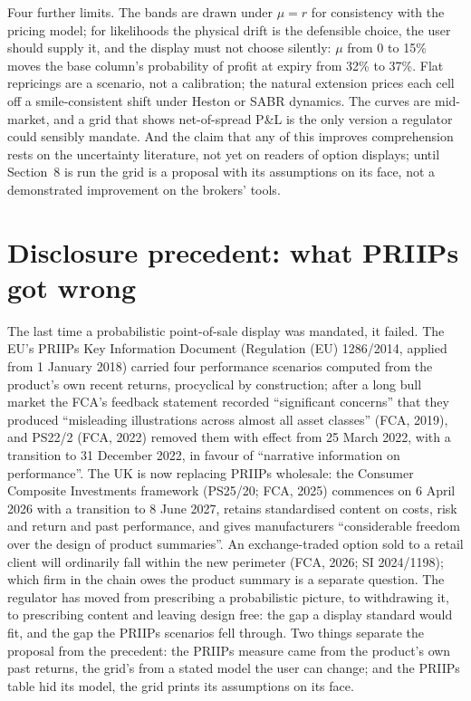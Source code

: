 \documentclass[11pt,a4paper]{article}
\newcommand{\PnL}{P\&L}
\begin{document}
Four further limits. The bands are drawn under $\mu = r$ for consistency with the pricing model; for likelihoods the physical drift is the defensible choice, the user should supply it, and the display must not choose silently: $\mu$ from 0 to 15\% moves the base column's probability of profit at expiry from 32\% to 37\%. Flat repricings are a scenario, not a calibration; the natural extension prices each cell off a smile-consistent shift under Heston or SABR dynamics. The curves are mid-market, and a grid that shows net-of-spread \PnL{} is the only version a regulator could sensibly mandate. And the claim that any of this improves comprehension rests on the uncertainty literature, not yet on readers of option displays; until Section~8 is run the grid is a proposal with its assumptions on its face, not a demonstrated improvement on the brokers' tools.

\section{Disclosure precedent: what PRIIPs got wrong}

\noindent The last time a probabilistic point-of-sale display was mandated, it failed. The EU's PRIIPs Key Information Document (Regulation (EU) 1286/2014, applied from 1 January 2018) carried four performance scenarios computed from the product's own recent returns, procyclical by construction; after a long bull market the FCA's feedback statement recorded ``significant concerns'' that they produced ``misleading illustrations across almost all asset classes'' (FCA, 2019), and PS22/2 (FCA, 2022) removed them with effect from 25 March 2022, with a transition to 31 December 2022, in favour of ``narrative information on performance''. The UK is now replacing PRIIPs wholesale: the Consumer Composite Investments framework (PS25/20; FCA, 2025) commences on 6 April 2026 with a transition to 8 June 2027, retains standardised content on costs, risk and return and past performance, and gives manufacturers ``considerable freedom over the design of product summaries''. An exchange-traded option sold to a retail client will ordinarily fall within the new perimeter (FCA, 2026; SI 2024/1198); which firm in the chain owes the product summary is a separate question. The regulator has moved from prescribing a probabilistic picture, to withdrawing it, to prescribing content and leaving design free: the gap a display standard would fit, and the gap the PRIIPs scenarios fell through. Two things separate the proposal from the precedent: the PRIIPs measure came from the product's own past returns, the grid's from a stated model the user can change; and the PRIIPs table hid its model, the grid prints its assumptions on its face.
\end{document}
